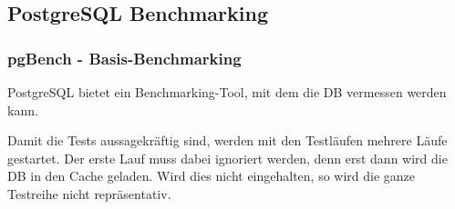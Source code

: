 
\begin{flushleft}
    \subsection{PostgreSQL Benchmarking}
    \subsubsection{pgBench - Basis-Benchmarking}
    PostgreSQL bietet ein Benchmarking-Tool\cite{TYJFF7AB,VXNYQFTE}, mit dem die DB vermessen werden kann.
\end{flushleft}
\begin{flushleft}
    Damit die Tests aussagekräftig sind, werden mit den Testläufen mehrere Läufe gestartet.
    Der erste Lauf muss dabei ignoriert werden, denn erst dann wird die DB in den Cache geladen.
    Wird dies nicht eingehalten, so wird die ganze Testreihe nicht repräsentativ.
\end{flushleft}

